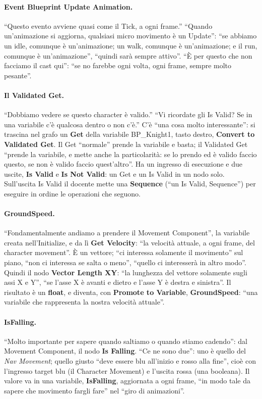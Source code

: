 \paragraph{Event Blueprint Update Animation.} ``Questo evento avviene quasi come il Tick,
a ogni frame.'' ``Quando un'animazione si aggiorna, qualsiasi micro movimento è un
Update'': ``se abbiamo un idle, comunque è un'animazione; un walk, comunque è
un'animazione; e il run, comunque è un'animazione'', ``quindi sarà sempre attivo''. ``È
per questo che non facciamo il cast qui'': ``se no farebbe ogni volta, ogni frame,
sempre molto pesante''.

\paragraph{Il Validated Get.} ``Dobbiamo vedere se questo character è valido.'' ``Vi
ricordate gli Is Valid? Se in una variabile c'è qualcosa dentro o non c'è.'' C'è ``una
cosa molto interessante'': si trascina nel grafo un \textbf{Get} della variabile
BP\_Knight1, tasto destro, \textbf{Convert to Validated Get}. Il Get ``normale'' prende la
variabile e basta; il Validated Get ``prende la variabile, e mette anche la
particolarità: se lo prendo ed è valido faccio questo, se non è valido faccio
quest'altro''. Ha un ingresso di esecuzione e due uscite, \textbf{Is Valid} e \textbf{Is
Not Valid}: un Get e un Is Valid in un nodo solo. Sull'uscita Is Valid il docente mette
una \textbf{Sequence} (``un Is Valid, Sequence'') per eseguire in ordine le operazioni
che seguono.

\paragraph{GroundSpeed.} ``Fondamentalmente andiamo a prendere il Movement Component'',
la variabile creata nell'Initialize, e da lì \textbf{Get Velocity}: ``la velocità attuale,
a ogni frame, del character movement''. È un vettore; ``ci interessa solamente il
movimento'' sul piano, ``non ci interessa se salta o meno'', ``quello ci interesserà in
altro modo''. Quindi il nodo \textbf{Vector Length XY}: ``la lunghezza del vettore
solamente sugli assi X e Y'', ``se l'asse X è avanti e dietro e l'asse Y è destra e
sinistra''. Il risultato è un \textbf{float}, e diventa, con \textbf{Promote to
Variable}, \textbf{GroundSpeed}: ``una variabile che rappresenta la nostra velocità
attuale''.

\paragraph{IsFalling.} ``Molto importante per sapere quando saltiamo o quando stiamo
cadendo'': dal Movement Component, il nodo \textbf{Is Falling}. ``Ce ne sono due'': uno è
quello del \emph{Nav Movement}; quello giusto ``deve essere blu all'inizio e rosso alla
fine'', cioè con l'ingresso target blu (il Character Movement) e l'uscita rossa (una
booleana). Il valore va in una variabile, \textbf{IsFalling}, aggiornata a ogni frame,
``in modo tale da sapere che movimento fargli fare'' nel ``giro di animazioni''.

